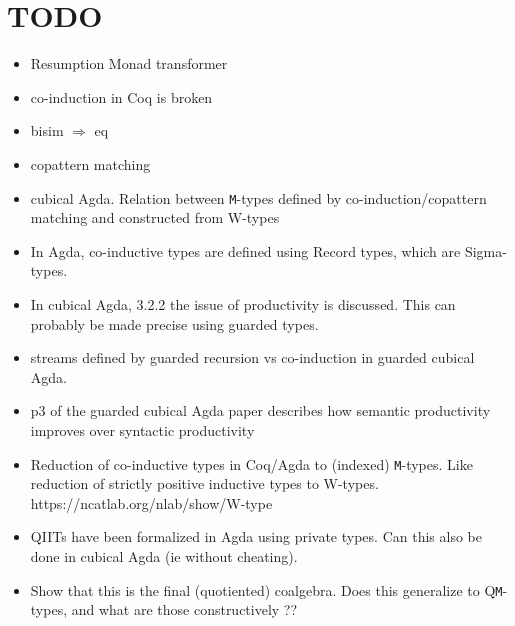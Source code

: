 \documentclass[twoside,11pt,openright]{report}
\theoremstyle{plain} %
\theoremstyle{definition}
\theoremstyle{remark}
\begin{document}
\section{TODO}
\begin{itemize}
\item Resumption Monad transformer
\item co-induction in Coq is broken
\item bisim \(\Rightarrow\) eq
\item copattern matching
\item cubical Agda. Relation between \texttt{M}-types defined by co-induction/copattern matching and constructed from W-types
\item   In Agda, co-inductive types are defined using Record types, which are Sigma-types. 
\item   In cubical Agda, 3.2.2 the issue of productivity is discussed. This can probably be made precise using guarded types.
\item streams defined by guarded recursion vs co-induction in guarded cubical Agda. 
\item    p3 of the guarded cubical Agda paper describes how semantic productivity improves over syntactic productivity
\item Reduction of co-inductive types in Coq/Agda to (indexed) \texttt{M}-types. Like reduction of strictly positive inductive types to W-types. https://ncatlab.org/nlab/show/W-type
\item QIITs have been formalized in Agda using private types. Can this also be done in cubical Agda (ie without cheating).
\item   Show that this is the final (quotiented) coalgebra. Does this generalize to Q\texttt{M}-types, and what are those constructively ??
\end{itemize}

\end{document}
